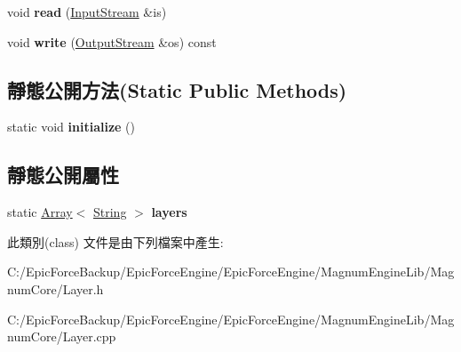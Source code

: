 \begin{DoxyCompactItemize}
\item 
void {\bfseries read} (\hyperlink{class_magnum_1_1_input_stream}{Input\+Stream} \&is)\hypertarget{class_magnum_1_1_layer_a81ed371d4688ac553d0569779e3f2601}{}\label{class_magnum_1_1_layer_a81ed371d4688ac553d0569779e3f2601}

\item 
void {\bfseries write} (\hyperlink{class_magnum_1_1_output_stream}{Output\+Stream} \&os) const \hypertarget{class_magnum_1_1_layer_aaabff3625bc9ead0ac209bb31ccff3fd}{}\label{class_magnum_1_1_layer_aaabff3625bc9ead0ac209bb31ccff3fd}

\end{DoxyCompactItemize}
\subsection*{靜態公開方法(Static Public Methods)}
\begin{DoxyCompactItemize}
\item 
static void {\bfseries initialize} ()\hypertarget{class_magnum_1_1_layer_a73e3b04ba32db857c1bf935b3153db44}{}\label{class_magnum_1_1_layer_a73e3b04ba32db857c1bf935b3153db44}

\end{DoxyCompactItemize}
\subsection*{靜態公開屬性}
\begin{DoxyCompactItemize}
\item 
static \hyperlink{class_magnum_1_1_array}{Array}$<$ \hyperlink{class_magnum_1_1_string}{String} $>$ {\bfseries layers}\hypertarget{class_magnum_1_1_layer_a05d82a002876614356efa0d93f68d65c}{}\label{class_magnum_1_1_layer_a05d82a002876614356efa0d93f68d65c}

\end{DoxyCompactItemize}


此類別(class) 文件是由下列檔案中產生\+:\begin{DoxyCompactItemize}
\item 
C\+:/\+Epic\+Force\+Backup/\+Epic\+Force\+Engine/\+Epic\+Force\+Engine/\+Magnum\+Engine\+Lib/\+Magnum\+Core/Layer.\+h\item 
C\+:/\+Epic\+Force\+Backup/\+Epic\+Force\+Engine/\+Epic\+Force\+Engine/\+Magnum\+Engine\+Lib/\+Magnum\+Core/Layer.\+cpp\end{DoxyCompactItemize}
